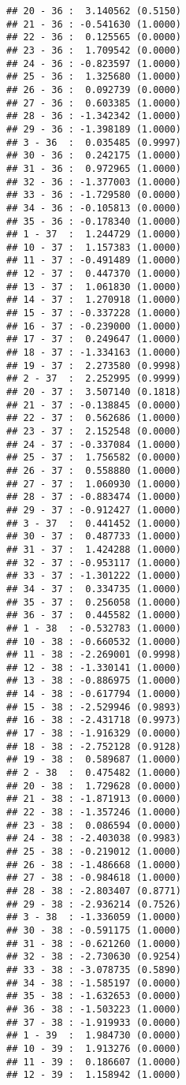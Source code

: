 \documentclass[12pt,]{article}
\begin{document}
\begin{verbatim}
## 20 - 36 :  3.140562 (0.5150)
## 21 - 36 : -0.541630 (1.0000)
## 22 - 36 :  0.125565 (0.0000)
## 23 - 36 :  1.709542 (0.0000)
## 24 - 36 : -0.823597 (1.0000)
## 25 - 36 :  1.325680 (1.0000)
## 26 - 36 :  0.092739 (0.0000)
## 27 - 36 :  0.603385 (1.0000)
## 28 - 36 : -1.342342 (1.0000)
## 29 - 36 : -1.398189 (1.0000)
## 3 - 36  :  0.035485 (0.9997)
## 30 - 36 :  0.242175 (1.0000)
## 31 - 36 :  0.972965 (1.0000)
## 32 - 36 : -1.377003 (1.0000)
## 33 - 36 : -1.729580 (0.0000)
## 34 - 36 : -0.105813 (0.0000)
## 35 - 36 : -0.178340 (1.0000)
## 1 - 37  :  1.244729 (1.0000)
## 10 - 37 :  1.157383 (1.0000)
## 11 - 37 : -0.491489 (1.0000)
## 12 - 37 :  0.447370 (1.0000)
## 13 - 37 :  1.061830 (1.0000)
## 14 - 37 :  1.270918 (1.0000)
## 15 - 37 : -0.337228 (1.0000)
## 16 - 37 : -0.239000 (1.0000)
## 17 - 37 :  0.249647 (1.0000)
## 18 - 37 : -1.334163 (1.0000)
## 19 - 37 :  2.273580 (0.9998)
## 2 - 37  :  2.252995 (0.9999)
## 20 - 37 :  3.507140 (0.1818)
## 21 - 37 : -0.138845 (0.0000)
## 22 - 37 :  0.562686 (1.0000)
## 23 - 37 :  2.152548 (0.0000)
## 24 - 37 : -0.337084 (1.0000)
## 25 - 37 :  1.756582 (0.0000)
## 26 - 37 :  0.558880 (1.0000)
## 27 - 37 :  1.060930 (1.0000)
## 28 - 37 : -0.883474 (1.0000)
## 29 - 37 : -0.912427 (1.0000)
## 3 - 37  :  0.441452 (1.0000)
## 30 - 37 :  0.487733 (1.0000)
## 31 - 37 :  1.424288 (1.0000)
## 32 - 37 : -0.953117 (1.0000)
## 33 - 37 : -1.301222 (1.0000)
## 34 - 37 :  0.334735 (1.0000)
## 35 - 37 :  0.256058 (1.0000)
## 36 - 37 :  0.445582 (1.0000)
## 1 - 38  : -0.532783 (1.0000)
## 10 - 38 : -0.660532 (1.0000)
## 11 - 38 : -2.269001 (0.9998)
## 12 - 38 : -1.330141 (1.0000)
## 13 - 38 : -0.886975 (1.0000)
## 14 - 38 : -0.617794 (1.0000)
## 15 - 38 : -2.529946 (0.9893)
## 16 - 38 : -2.431718 (0.9973)
## 17 - 38 : -1.916329 (0.0000)
## 18 - 38 : -2.752128 (0.9128)
## 19 - 38 :  0.589687 (1.0000)
## 2 - 38  :  0.475482 (1.0000)
## 20 - 38 :  1.729628 (0.0000)
## 21 - 38 : -1.871913 (0.0000)
## 22 - 38 : -1.357246 (1.0000)
## 23 - 38 :  0.086594 (0.0000)
## 24 - 38 : -2.403038 (0.9983)
## 25 - 38 : -0.219012 (1.0000)
## 26 - 38 : -1.486668 (1.0000)
## 27 - 38 : -0.984618 (1.0000)
## 28 - 38 : -2.803407 (0.8771)
## 29 - 38 : -2.936214 (0.7526)
## 3 - 38  : -1.336059 (1.0000)
## 30 - 38 : -0.591175 (1.0000)
## 31 - 38 : -0.621260 (1.0000)
## 32 - 38 : -2.730630 (0.9254)
## 33 - 38 : -3.078735 (0.5890)
## 34 - 38 : -1.585197 (0.0000)
## 35 - 38 : -1.632653 (0.0000)
## 36 - 38 : -1.503223 (1.0000)
## 37 - 38 : -1.919933 (0.0000)
## 1 - 39  :  1.984730 (0.0000)
## 10 - 39 :  1.913276 (0.0000)
## 11 - 39 :  0.186607 (1.0000)
## 12 - 39 :  1.158942 (1.0000)

\end{verbatim}
\end{document}
